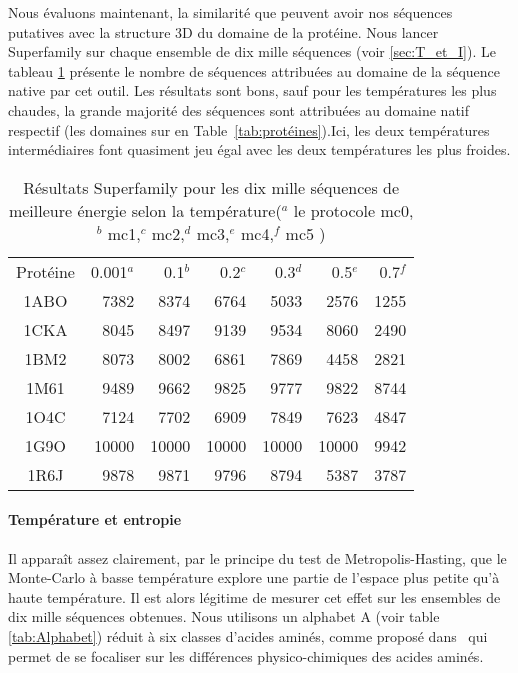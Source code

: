 Nous évaluons maintenant, la similarité que peuvent avoir nos séquences putatives avec la structure 3D du domaine de la protéine. Nous lancer Superfamily sur chaque ensemble de dix mille séquences (voir \ref{sec:T_et_I}). Le tableau \ref{tab:SF_mc} présente le nombre de séquences attribuées au domaine de la séquence native par cet outil. Les résultats sont bons, sauf pour les températures les plus chaudes, la grande majorité des séquences sont attribuées au domaine natif respectif (les domaines sur en Table~\ref{tab:protéines}).Ici, les deux températures intermédiaires font quasiment jeu égal avec les deux températures les plus froides.
    \begin{table}[!htbp]
      \centering
      
      \begin{tabular}{crrrrrr}      
        \toprule
         Protéine & 0.001$^a$ & 0.1$^b$ & 0.2$^c$  & 0.3$^d$ & 0.5$^e$ & 0.7$^f$  \\
        \cmidrule{1-7}
        1ABO & 7382  & 8374 & 6764 & 5033 & 2576  & 1255  \\      
        1CKA & 8045  & 8497 & 9139 & 9534 & 8060  & 2490  \\  
        1BM2 & 8073  & 8002 & 6861 & 7869 & 4458  & 2821  \\  
        1M61 & 9489  & 9662 & 9825 & 9777 & 9822  & 8744  \\  
        1O4C & 7124  & 7702 & 6909 & 7849 & 7623  & 4847  \\  
        1G9O & 10000 & 10000 & 10000 & 10000 & 10000  & 9942 \\  
        1R6J & 9878  & 9871 & 9796 & 8794 & 5387 & 3787 \\  

        \bottomrule
        
      \end{tabular}
      

      \caption{Résultats Superfamily pour les dix mille séquences de meilleure énergie selon la température($^a$ le protocole mc0,$^b$ mc1,$^c$  mc2,$^d$ mc3,$^e$ mc4,$^f$ mc5 )}      
      \label{tab:SF_mc}
    \end{table}



   \paragraph{Température et entropie} 

Il apparaît assez clairement, par le principe du test de Metropolis-Hasting, que le Monte-Carlo à basse température explore une partie de l'espace plus petite qu'à haute température. Il est alors légitime de mesurer cet effet sur les ensembles de dix mille séquences obtenues. Nous utilisons un alphabet A (voir table \ref{tab:Alphabet}) réduit à six classes d'acides aminés, comme proposé dans~\citep{refAlphabet} qui permet de se focaliser sur les différences physico-chimiques des acides aminés.  

